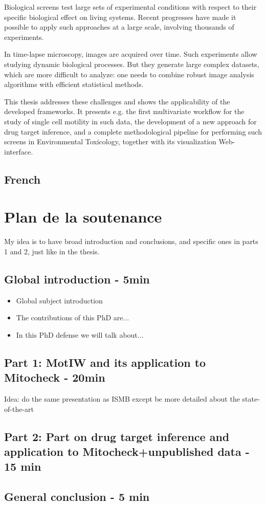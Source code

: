 \documentclass[12pt]{article}
\begin{document}
Biological screens test large sets of experimental conditions with
respect to their specific biological effect on living systems. Recent
progresses have made it possible to apply such approaches at a large
scale, involving thousands of experiments. 

In time-lapse microscopy, images are acquired over time. Such
experiments allow studying dynamic biological processes. But they
generate large complex datasets, which are more difficult to analyze:
one needs to combine robust image analysis algorithms with efficient
statistical methods.  

This thesis addresses these challenges and shows the applicability of
the developed frameworks. It presents e.g. the first multivariate
workflow for the study of single cell motility in such data, the
development of a new approach for drug target inference, and a
complete methodological pipeline for performing such screens in
Environmental Toxicology, together with its visualization
Web-interface. 

\subsection{French}

\section{Plan de la soutenance}
My idea is to have broad introduction and conclusions, and specific ones in parts 1 and 2, just like in the thesis.
\subsection*{Global introduction - 5min}
\begin{itemize}
\item Global subject introduction
\item The contributions of this PhD are... 
\item In this PhD defense we will talk about...
\end{itemize}
\subsection*{Part 1: MotIW and its application to Mitocheck - 20min}
Idea: do the same presentation as ISMB except be more detailed about the state-of-the-art
\subsection*{Part 2: Part on drug target inference and application to Mitocheck+unpublished data - 15 min}
\subsection*{General conclusion - 5 min}
\end{document}
